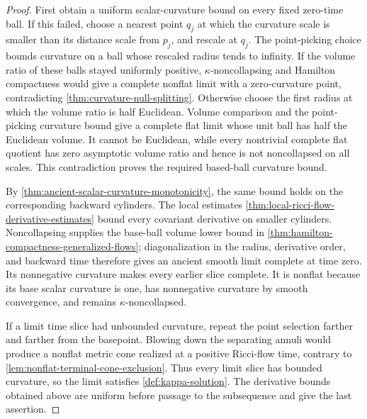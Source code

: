 \begin{proof}
First obtain a uniform scalar-curvature bound on every fixed zero-time ball.
If this failed, choose a nearest point $q_j$ at which the curvature scale is
smaller than its distance scale from $p_j$, and rescale at $q_j$.  The
point-picking choice bounds curvature on a ball whose rescaled radius tends
to infinity.  If the volume ratio of these balls stayed uniformly positive,
$\kappa$-noncollapsing and Hamilton compactness would give a complete
nonflat limit with a zero-curvature point, contradicting
\ref{thm:curvature-null-splitting}.  Otherwise choose the first radius at
which the volume ratio is
half Euclidean.  Volume comparison and the point-picking curvature bound
give a complete flat limit whose unit ball has half the Euclidean volume.
It cannot be Euclidean, while every nontrivial complete flat quotient has
zero asymptotic volume ratio and hence is not noncollapsed on all scales.
This contradiction proves the required based-ball curvature bound.

By \ref{thm:ancient-scalar-curvature-monotonicity}, the same bound holds on
the corresponding backward cylinders.  The local estimates
\ref{thm:local-ricci-flow-derivative-estimates} bound every covariant
derivative on smaller cylinders.
Noncollapsing supplies the base-ball volume lower bound in
\ref{thm:hamilton-compactness-generalized-flows}; diagonalization in the
radius, derivative order, and backward time therefore gives an ancient
smooth limit complete at time zero.  Its nonnegative curvature makes every
earlier slice complete.  It is nonflat because its base scalar curvature is
one, has nonnegative curvature by smooth convergence, and remains
$\kappa$-noncollapsed.

If a limit time slice had unbounded curvature, repeat the point selection
farther and farther from the basepoint.  Blowing down the separating annuli
would produce a nonflat metric cone realized at a positive Ricci-flow time,
contrary to \ref{lem:nonflat-terminal-cone-exclusion}.  Thus every limit
slice has bounded curvature, so the limit satisfies
\ref{def:kappa-solution}.  The derivative bounds obtained above are uniform
before passage to the subsequence and give the last assertion.
\end{proof}

